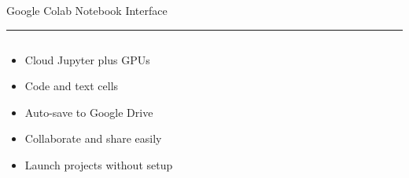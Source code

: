 \documentclass[aspectratio=169]{beamer}
\newcommand{\TitleFont}{\rmfamily}
\begin{document}
\begin{frame}[t]{}
  \vspace*{0.5cm}
  {\TitleFont\fontsize{18}{22}\selectfont\color{LUBronze}Google Colab Notebook Interface\par}
  \vspace{0.3em}
  {\color{LUBronze}\rule{\linewidth}{0.8pt}}\par
  \vspace{0.2cm}
  \begin{columns}[t]
    \begin{column}[t]{0.4\textwidth}
      \vspace*{0pt}
      \begin{itemize}\setlength\itemsep{0.65em}
        \item Cloud Jupyter plus GPUs
        \item Code and text cells
        \item Auto-save to Google Drive
        \item Collaborate and share easily
        \item Launch projects without setup
      \end{itemize}
    \end{column}
  \end{columns}
\end{frame}
\end{document}
